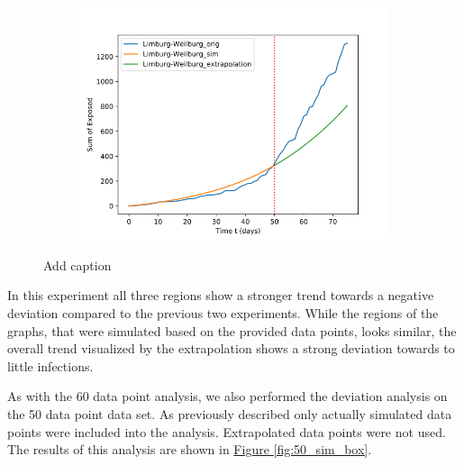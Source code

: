 \begin{figure}
\begin{subfigure}[b]{0.3\textwidth}
		\includegraphics[width=\textwidth]{./figures/50d/10_Limburg-Weilburg.png}	
		\caption{}
	\end{subfigure}
	\caption{Add caption
		}
	\label{fig:50_sim_expl}
\end{figure}
In this experiment all three
regions show a stronger trend towards a negative deviation compared to the previous two experiments. While the regions of
the graphs, that were simulated based on the provided data points, looks similar, the overall trend visualized by
the extrapolation shows a strong deviation towards to little infections.

As with the 60 data point analysis, we also performed the deviation analysis on the 50 data point data set. As previously described
only actually simulated data points were included into the analysis. Extrapolated data points were not used. The results of this
analysis are shown in \hyperref[fig:50_sim_box]{Figure \ref*{fig:50_sim_box}}.

